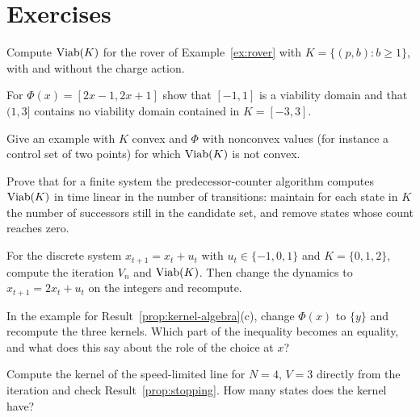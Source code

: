 \section*{Exercises}

\begin{exercise}
Compute $\operatorname{Viab}(K)$ for the rover of Example~\ref{ex:rover} with $K=\{(p,b):b\ge1\}$, with and without the charge action.
\end{exercise}

\begin{exercise}
For $\Phi(x)=[2x-1,2x+1]$ show that $[-1,1]$ is a viability domain and that $(1,3]$ contains no viability domain contained in $K=[-3,3]$.
\end{exercise}

\begin{exercise}
Give an example with $K$ convex and $\Phi$ with nonconvex values (for instance a control set of two points) for which $\operatorname{Viab}(K)$ is not convex.
\end{exercise}

\begin{exercise}
Prove that for a finite system the predecessor-counter algorithm computes $\operatorname{Viab}(K)$ in time linear in the number of transitions: maintain for each state in $K$ the number of successors still in the candidate set, and remove states whose count reaches zero.
\end{exercise}

\begin{exercise}
For the discrete system $x_{t+1}=x_t+u_t$ with $u_t\in\{-1,0,1\}$ and $K=\{0,1,2\}$, compute the iteration $V_n$ and $\operatorname{Viab}(K)$. Then change the dynamics to $x_{t+1}=2x_t+u_t$ on the integers and recompute.
\end{exercise}

\begin{exercise}
In the example for Result~\ref{prop:kernel-algebra}(c), change $\Phi(x)$ to $\{y\}$ and recompute the three kernels. Which part of the inequality becomes an equality, and what does this say about the role of the choice at $x$?
\end{exercise}

\begin{exercise}
Compute the kernel of the speed-limited line for $N=4$, $V=3$ directly from the iteration and check Result~\ref{prop:stopping}. How many states does the kernel have?\label{ex2:line-kernel}
\end{exercise}

